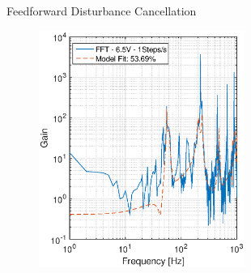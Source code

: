 \documentclass[10pt]{beamer}
\begin{document}
\begin{frame}{Feedforward Disturbance Cancellation}
  \begin{figure}[h!]
    \centering %
    \includegraphics[width=0.6\textwidth,]{../fig/matlab/model_fit_1step_s.eps}
  \end{figure}
\end{frame}
\end{document}
